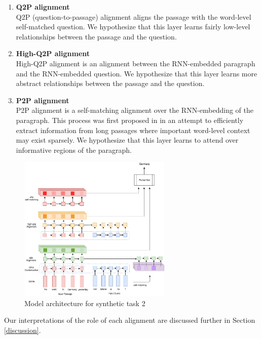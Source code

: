 \documentclass{article}
\begin{document}
\begin{enumerate}
	\item \textbf{Q2P alignment} \\
	Q2P (question-to-passage) alignment aligns the passage with the word-level self-matched question. We hypothesize that this layer learns fairly low-level relationships between the passage and the question.
	
	\item \textbf{High-Q2P alignment} \\
	High-Q2P alignment is an alignment between the RNN-embedded paragraph and the RNN-embedded question. We hypothesize that this layer learns more abstract relationships between the passage and the question.
	
	\item \textbf{P2P alignment} \\
	P2P alignment is a self-matching alignment over the RNN-embedding of the paragraph. This process was first proposed in \cite{RNet} in an attempt to efficiently extract information from long passages where important word-level context may exist sparsely. We hypothesize that this layer learns to attend over informative regions of the paragraph. 
\end{enumerate}
 
\begin{figure}[h]
	\includegraphics[width=0.65\textwidth]{model.png}
	\centering
	\caption{Model architecture for synthetic task 2}
	\label{fig:QA_model}
\end{figure}

Our interpretations of the role of each alignment are discussed further in Section \ref{discussion}. \\
\end{document}
